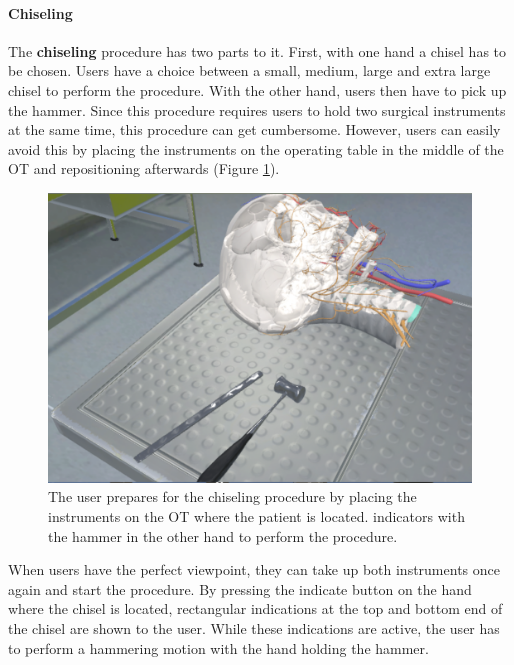 \paragraph{Chiseling}

The \textbf{chiseling} procedure has two parts to it.
First, with one hand a chisel has to be chosen.
Users have a choice between a small, medium, large and extra large chisel to perform the procedure.
With the other hand, users then have to pick up the hammer.
Since this procedure requires users to hold two surgical instruments at the same time, this procedure can get cumbersome.
However, users can easily avoid this by placing the instruments on the operating table in the middle of the OT and repositioning afterwards (Figure \ref{fig::ChiselPrepare}).

\begin{figure}[ht]
    \centering
    \includegraphics[width=\linewidth]{images/implementation/features/procedures/chisel_prepare.png}
    \caption{\label{fig::ChiselPrepare}The user prepares for the chiseling procedure by placing the instruments on the OT where the patient is located.
    indicators with the hammer in the other hand to perform the procedure.}
\end{figure}

When users have the perfect viewpoint, they can take up both instruments once again and start the procedure.
By pressing the indicate button on the hand where the chisel is located, rectangular indications at the top and bottom end of the chisel are shown to the user.
While these indications are active, the user has to perform a hammering motion with the hand holding the hammer.

